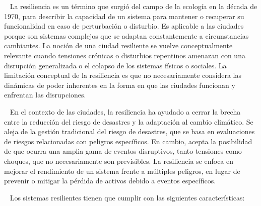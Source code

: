 \documentclass{article}
\begin{document}
~ La resiliencia es un término que surgió del campo de la ecología en la
década de 1970, para describir la capacidad de un sistema para mantener
o recuperar su funcionalidad en caso de perturbación o disturbio. Es
aplicable a las ciudades porque son sistemas complejos que se adaptan
constantemente a circunstancias cambiantes. La noción de una ciudad
resiliente se vuelve conceptualmente relevante cuando tensiones crónicas
o disturbios repentinos amenazan con una disrupción generalizada o el
colapso de los sistemas físicos o sociales. La limitación conceptual de
la resiliencia es que no necesariamente considera las dinámicas de poder
inherentes en la forma en que las ciudades funcionan y enfrentan las
disrupciones.

~ En el contexto de las ciudades, la resiliencia ha ayudado a cerrar la
brecha entre la reducción del riesgo de desastres y la adaptación al
cambio climático. Se aleja de la gestión tradicional del riesgo de
desastres, que se basa en evaluaciones de riesgos relacionadas con
peligros específicos. En cambio, acepta la posibilidad de que ocurra una
amplia gama de eventos disruptivos, tanto tensiones como choques, que no
necesariamente son previsibles. La resiliencia se enfoca en mejorar el
rendimiento de un sistema frente a múltiples peligros, en lugar de
prevenir o mitigar la pérdida de activos debido a eventos específicos.

~ Los sistemas resilientes tienen que cumplir con las siguientes
características:
\end{document}
